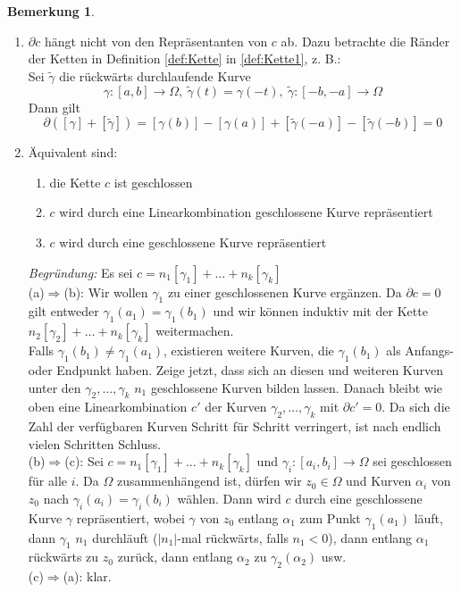 \documentclass[11pt,titlepage]{article}
\theoremstyle{definition}
\newtheorem{remark}{Bemerkung}
\theoremstyle{remark}
\begin{document}
	\begin{remark} \label{rem:3.3}
		\begin{enumerate}
			\item	$\partial c$ hängt nicht von den Repräsentanten von $c$ ab. Dazu betrachte die 
			Ränder der Ketten in Definition \ref{def:Kette} in \ref{def:Kette1}, z. B.: \\
			Sei $\tilde{\gamma}$ die rückwärts durchlaufende Kurve
			\[\gamma:[a,b]\to\Omega,\ \tilde{\gamma}(t)=\gamma(-t),\ \tilde{\gamma}:[-b,-a]\to\Omega \]
			Dann gilt
			\[\partial([\gamma]+[\tilde{\gamma}])=[\gamma(b)]-[\gamma(a)]+[\tilde{\gamma}(-a)]-
			[\tilde{\gamma}(-b)]=0 \]
			
			\item Äquivalent sind:
			\begin{enumerate}
				\item die Kette $c$ ist geschlossen
				\item $c$ wird durch eine Linearkombination geschlossene Kurve repräsentiert
				\item $c$ wird durch eine geschlossene Kurve repräsentiert
			\end{enumerate}
			\textsl{Begründung:} Es sei $c=n_1 [\gamma_1]+\ldots+n_k[\gamma_k]$ \\
			(a)$\Rightarrow$(b): Wir wollen $\gamma_1$ zu einer geschlossenen Kurve ergänzen. 
			Da $\partial c=0$ gilt entweder $\gamma_1(a_1)=\gamma_1(b_1)$ und wir können induktiv 
			mit der Kette $n_2 [\gamma_2]+\ldots+n_k[\gamma_k]$ weitermachen. \\
			Falls $\gamma_1(b_1)\neq\gamma_1(a_1)$, existieren weitere Kurven, die $\gamma_1(b_1)$ 
			als Anfangs- oder Endpunkt haben. Zeige jetzt, dass sich an diesen und weiteren Kurven 
			unter den $\gamma_2,\ldots,\gamma_k$ $n_1$ geschlossene Kurven bilden lassen. 
			Danach bleibt wie oben eine Linearkombination $c'$ der Kurven $\gamma_2,\ldots,\gamma_k$ 
			mit $\partial c'=0$. Da sich die Zahl der verfügbaren Kurven Schritt für Schritt verringert, 
			ist nach endlich vielen Schritten Schluss. \\
			(b)$\Rightarrow$(c): Sei $c=n_1[\gamma_1]+\ldots+n_k[\gamma_k]$ und 
			$\gamma_i :[a_i,b_i]\to\Omega$ sei geschlossen für alle $i$. Da $\Omega$ zusammenhängend 
			ist, dürfen wir $z_0\in\Omega$ und Kurven $\alpha_i$ von $z_0$ nach $\gamma_i(a_i)=
			\gamma_i(b_i)$ wählen. Dann wird $c$ durch eine geschlossene Kurve $\gamma$ 
			repräsentiert, wobei $\gamma$ von $z_0$ entlang $\alpha_1$ zum Punkt $\gamma_1(a_1)$ 
			läuft, dann $\gamma_1$ $n_1$ durchläuft ($|n_1|$-mal rückwärts, falls $n_1<0$), dann 
			entlang $\alpha_1$ rückwärts zu $z_0$ zurück, dann entlang $\alpha_2$ zu 
			$\gamma_2(\alpha_2)$ usw. \\
			(c)$\Rightarrow$(a): klar.
		\end{enumerate}
	\end{remark}
\end{document}
